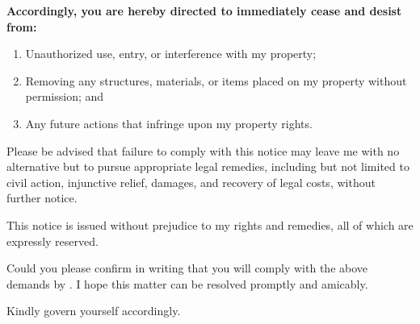 \vspace{0.3cm}

\textbf{Accordingly, you are hereby directed to immediately cease and desist from:}
\begin{enumerate}
  \item Unauthorized use, entry, or interference with my property;
  \item Removing any structures, materials, or items placed on my property without permission; and
  \item Any future actions that infringe upon my property rights.
\end{enumerate}

Please be advised that failure to comply with this notice may leave me with no alternative but to pursue appropriate legal remedies, including but not limited to civil action, injunctive relief, damages, and recovery of legal costs, without further notice.

This notice is issued without prejudice to my rights and remedies, all of which are expressly reserved.

Could you please confirm in writing that you will comply with the above demands by \Deadline{}. I hope this matter can be resolved promptly and amicably. 

Kindly govern yourself accordingly.

